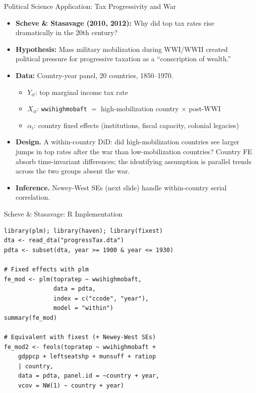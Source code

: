 \documentclass[aspectratio=169, handout]{beamer}
\numberwithin{equation}{section}
\begin{document}
\begin{frame}{Political Science Application: Tax Progressivity and War}
\begin{itemize}
\item \textbf{Scheve \& Stasavage (2010, 2012):} Why did top tax rates rise dramatically in the 20th century?
\item \textbf{Hypothesis:} Mass military mobilization during WWI/WWII created political pressure for progressive taxation as a ``conscription of wealth.''
\item \textbf{Data:} Country-year panel, 20 countries, 1850--1970.
\begin{itemize}
\item $Y_{it}$: top marginal income tax rate
\item $X_{it}$: \texttt{wwihighmobaft} $=$ high-mobilization country $\times$ post-WWI
\item $\alpha_i$: country fixed effects (institutions, fiscal capacity, colonial legacies)
\end{itemize}\pause
\item \textbf{Design.} A within-country DiD: did high-mobilization countries see larger jumps in top rates after the war than low-mobilization countries? Country FE absorb time-invariant differences; the identifying assumption is parallel trends across the two groups absent the war.
\item \textbf{Inference.} Newey-West SEs (next slide) handle within-country serial correlation.
\end{itemize}
\end{frame}

\begin{frame}[fragile]{Scheve \& Stasavage: R Implementation}
\begin{lstlisting}[basicstyle=\ttfamily\scriptsize]
library(plm); library(haven); library(fixest)
dta <- read_dta("progressTax.dta")
pdta <- subset(dta, year >= 1900 & year <= 1930)

# Fixed effects with plm
fe_mod <- plm(topratep ~ wwihighmobaft,
              data = pdta,
              index = c("ccode", "year"),
              model = "within")
summary(fe_mod)

# Equivalent with fixest (+ Newey-West SEs)
fe_mod2 <- feols(topratep ~ wwihighmobaft +
    gdppcp + leftseatshp + munsuff + ratiop
    | country,
    data = pdta, panel.id = ~country + year,
    vcov = NW(1) ~ country + year)
\end{lstlisting}
\end{frame}
\end{document}
